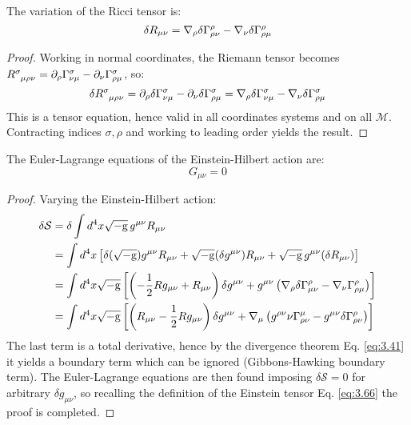 \begin{lemma}
  The variation of the Ricci tensor is:
  \begin{equation}
    \delta R_{\mu \nu} = \nabla_\rho \delta \Gamma^\rho_{\rho \nu} - \nabla_\nu \delta \Gamma^\rho_{\rho \mu}
    \label{eq:4.4}
  \end{equation}
\end{lemma}
\begin{proof}
  Working in normal coordinates, the Riemann tensor becomes $ \tensor{R}{^\sigma_{\mu \rho \nu}} = \pa_\rho \Gamma^\sigma_{\nu \mu} - \pa_\nu \Gamma^\sigma_{\rho \mu} $, so:
  \begin{equation*}
    \delta \tensor{R}{^\sigma_{\mu \rho \nu}} = \pa_\rho \delta \Gamma^\sigma_{\nu \mu} - \pa_\nu \delta \Gamma^\sigma_{\rho \mu} = \na_\rho \delta \Gamma^\sigma_{\nu \mu} - \na_\nu \delta \Gamma^\sigma_{\rho \mu}
  \end{equation*}
  This is a tensor equation, hence valid in all coordinates systems and on all $ \mathcal{M} $. Contracting indices $ \sigma,\rho $ and working to leading order yields the result.
\end{proof}

\begin{proposition}\label{prop-einst-eq}
  The Euler-Lagrange equations of the Einstein-Hilbert action are:
  \begin{equation}
    G_{\mu \nu} = 0
    \label{eq:4.5}
  \end{equation}
\end{proposition}
\begin{proof}
  Varying the Einstein-Hilbert action:
  \begin{equation*}
    \begin{split}
      \delta \mathcal{S}
      &= \delta \int d^4 x \sqrt{-\mathrm{g}}\, g^{\mu \nu} R_{\mu \nu} \\
      &= \int d^4 x \left[ \delta (\sqrt{-\mathrm{g}}) g^{\mu \nu} R_{\mu \nu} + \sqrt{-\mathrm{g}} (\delta g^{\mu \nu}) R_{\mu \nu} + \sqrt{-\mathrm{g}}\, g^{\mu \nu} (\delta R_{\mu \nu}) \right] \\
      &= \int d^4 x \sqrt{-\mathrm{g}} \left[ \left( - \frac{1}{2} R g_{\mu \nu} + R_{\mu \nu} \right) \delta g^{\mu \nu} + g^{\mu \nu} \left( \nabla_\rho \delta \Gamma^\rho_{\mu \nu} - \nabla_\nu \Gamma^\rho_{\rho \mu} \right) \right] \\
      &= \int d^4 x \sqrt{-\mathrm{g}} \left[ \left( R_{\mu \nu} - \frac{1}{2} R g_{\mu \nu} \right) \delta g^{\mu \nu} + \nabla_\mu \left( g^{\rho \nu} \nu \Gamma^\mu_{\rho \nu} - g^{\mu \nu} \delta \Gamma^\rho_{\rho \nu} \right) \right]
    \end{split}
  \end{equation*}
  The last term is a total derivative, hence by the divergence theorem Eq. \ref{eq:3.41} it yields a boundary term which can be ignored (Gibbons-Hawking boundary term). The Euler-Lagrange equations are then found imposing $ \delta \mathcal{S} = 0 $ for arbitrary $ \delta g_{\mu \nu} $, so recalling the definition of the Einstein tensor Eq. \ref{eq:3.66} the proof is completed.
\end{proof}

